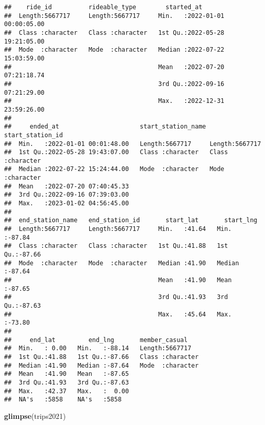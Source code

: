 \documentclass[
]{article}
\newenvironment{Shaded}{\begin{snugshade}}{\end{snugshade}}
\newcommand{\FunctionTok}[1]{\textcolor[rgb]{0.13,0.29,0.53}{\textbf{#1}}}
\newcommand{\NormalTok}[1]{#1}
\begin{document}
\begin{verbatim}
##    ride_id          rideable_type        started_at                    
##  Length:5667717     Length:5667717     Min.   :2022-01-01 00:00:05.00  
##  Class :character   Class :character   1st Qu.:2022-05-28 19:21:05.00  
##  Mode  :character   Mode  :character   Median :2022-07-22 15:03:59.00  
##                                        Mean   :2022-07-20 07:21:18.74  
##                                        3rd Qu.:2022-09-16 07:21:29.00  
##                                        Max.   :2022-12-31 23:59:26.00  
##                                                                        
##     ended_at                      start_station_name start_station_id  
##  Min.   :2022-01-01 00:01:48.00   Length:5667717     Length:5667717    
##  1st Qu.:2022-05-28 19:43:07.00   Class :character   Class :character  
##  Median :2022-07-22 15:24:44.00   Mode  :character   Mode  :character  
##  Mean   :2022-07-20 07:40:45.33                                        
##  3rd Qu.:2022-09-16 07:39:03.00                                        
##  Max.   :2023-01-02 04:56:45.00                                        
##                                                                        
##  end_station_name   end_station_id       start_lat       start_lng     
##  Length:5667717     Length:5667717     Min.   :41.64   Min.   :-87.84  
##  Class :character   Class :character   1st Qu.:41.88   1st Qu.:-87.66  
##  Mode  :character   Mode  :character   Median :41.90   Median :-87.64  
##                                        Mean   :41.90   Mean   :-87.65  
##                                        3rd Qu.:41.93   3rd Qu.:-87.63  
##                                        Max.   :45.64   Max.   :-73.80  
##                                                                        
##     end_lat         end_lng       member_casual     
##  Min.   : 0.00   Min.   :-88.14   Length:5667717    
##  1st Qu.:41.88   1st Qu.:-87.66   Class :character  
##  Median :41.90   Median :-87.64   Mode  :character  
##  Mean   :41.90   Mean   :-87.65                     
##  3rd Qu.:41.93   3rd Qu.:-87.63                     
##  Max.   :42.37   Max.   :  0.00                     
##  NA's   :5858    NA's   :5858
\end{verbatim}

\begin{Shaded}
\begin{Highlighting}[]
\FunctionTok{glimpse}\NormalTok{(trips2021)}
\end{Highlighting}
\end{Shaded}
\end{document}
